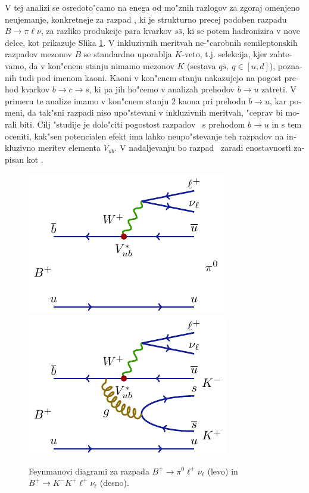 \begin{otherlanguage}{slovene}
V tej analizi se osredoto"camo na enega od mo"znih razlogov za zgoraj omenjeno neujemanje, konkretneje za razpad \decayb, ki je strukturno precej podoben razpadu $B \to \pi \ell \nu$, za razliko produkcije para kvarkov $s \bar s$, ki se potem hadronizira v nove delce, kot prikazuje Slika \ref{feynman_si}. V inkluzivnih meritvah ne-"carobnih semileptonskih razpadov mezonov $B$ se standardno uporablja $K$-veto, t.j. selekcija, kjer zahtevamo, da v kon"cnem stanju nimamo mezonov $K$ (sestava $q \bar s,~q \in [u,d]$), poznanih tudi pod imenom kaoni. Kaoni v kon"cnem stanju nakazujejo na pogost prehod kvarkov $b \to c \to s$, ki pa jih ho"cemo v analizah prehodov $b \to u$ zatreti. V primeru te analize imamo v kon"cnem stanju 2 kaona pri prehodu $b \to u$, kar pomeni, da tak"sni razpadi niso upo"stevani v inkluzivnih meritvah, "ceprav bi morali biti. Cilj "studije je dolo"citi pogostost razpadov \decayb~s prehodom $b\to u$ in s tem oceniti, kak"sen potencialen efekt ima lahko neupo"stevanje teh razpadov na inkluzivno meritev elementa $V_{ub}$. V nadaljevanju bo razpad \decayb~zaradi enostavnosti zapisan kot \decaya.
\begin{figure}[H]
\centering
\includegraphics{texfig/B2pilnu}
\hspace{1cm}
\includegraphics{texfig/B2KKlnu}
	\captionsetup{width=0.8\linewidth}
\caption{Feynmanovi diagrami za razpada $B^+ \to \pi^0 \ell^+ \nu_\ell$ (levo) in $B^+ \to K^- K^+ \ell^+ \nu_\ell$ (desno).}
\label{feynman_si}
\end{figure}


\end{otherlanguage}
